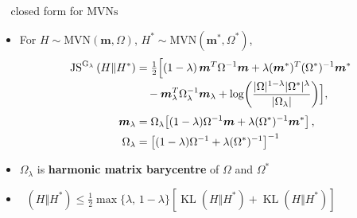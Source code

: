 \documentclass[14pt,aspectratio=169]{beamer}
\DeclareMathOperator{\KL}{KL}
\DeclarePairedDelimiter\abs{\lvert}{\rvert}%
\newcommand{\JSGa}{\mathop{\mathrm{JS}^{\mathrm{G}_{\lambda}}}\nolimits}
\begin{document}
\begin{frame}[t, noframenumbering]{$\JSGa$ closed form for $\mathrm{MVNs}$}
  \begin{itemize}\setlength{\itemsep}{2pt}
    \item <1-> For $H \sim \mathrm{MVN}(\boldsymbol{m}, \Omega)$, $H^* \sim \mathrm{MVN}(\boldsymbol{m}^*, \Omega^*)$, 
    \begin{align*}
    \JSGa{}(H \Vert H^*)
      &= \tfrac12 \Bigl[
          (1-\lambda)\,\boldsymbol{m}^T \Omega^{-1} \boldsymbol{m}
          + \lambda (\boldsymbol{m}^*)^T (\Omega^*)^{-1} \boldsymbol{m}^*
    \\[-0.2em] &\quad
          - \boldsymbol{m}_{\lambda}^T \Omega_{\lambda}^{-1} \boldsymbol{m}_{\lambda}
          + \log\!\left(
              \frac{
                \abs{\Omega}^{1-\lambda} \abs{\Omega^*}^{\lambda}
              }{
                \abs{\Omega_{\lambda}}
              }
            \right)
        \Bigr], \\[0.3em]
    \boldsymbol{m}_{\lambda}
      &= \Omega_{\lambda}\!\left[
          (1-\lambda)\Omega^{-1}\boldsymbol{m}
          + \lambda(\Omega^*)^{-1}\boldsymbol{m}^*
        \right], \\
    \Omega_{\lambda}
      &= \left[
          (1-\lambda)\Omega^{-1}
          + \lambda(\Omega^*)^{-1}
        \right]^{-1} 
    \end{align*}
  \item $\Omega_{\lambda}$ is \textbf{harmonic matrix barycentre} of $\Omega$ and $\Omega^*$ 
  \item $\JSGa{(H \Vert H^*)} \leq \frac{1}{2}\max\{\lambda,\,1-\lambda\}\left[\KL{}(H \Vert H^*) + \KL{}(H \Vert H^*)\right]$
  \end{itemize}
\end{frame}
\end{document}
